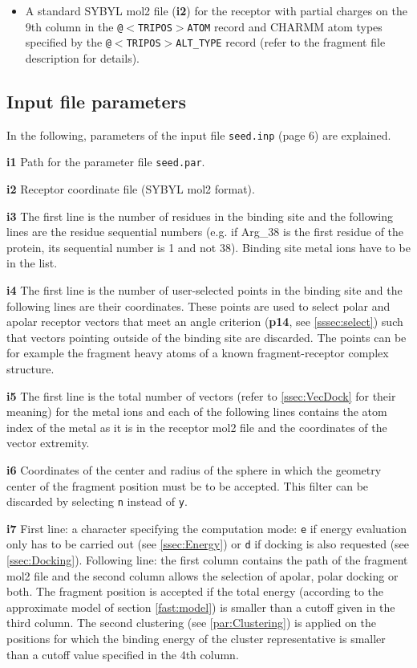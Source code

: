 \documentclass[a4paper,12pt,titlepage]{article}
\begin{document}
\begin{itemize}
\item
A standard SYBYL mol2 file ({\bf i2}) for the receptor with partial charges on the 
9th column in the {\tt @$<$TRIPOS$>$ATOM} record and CHARMM atom types specified by the {\tt @$<$TRIPOS$>$ALT\_TYPE} record (refer to the fragment file description for details).

\end{itemize}

\subsection{Input file parameters}

In the following, parameters of the input file {\tt seed.inp} (page 6) 
are explained.

\noindent
{\bf i1}
Path for the parameter file {\tt seed.par}.

\noindent
{\bf i2}
Receptor coordinate file (SYBYL mol2 format).

\noindent
{\bf i3}
The first line is the number of residues in the binding site and the 
following lines are the residue sequential numbers 
(e.g. if Arg\_38 is the first residue of the protein, its sequential 
number is 1 and not 38). Binding site metal ions 
have to be in the list.

\noindent
{\bf i4}
The first line is the number of user-selected points in the binding site and 
the following lines are their coordinates. These points are used to select 
polar and apolar receptor vectors that meet an angle criterion 
({\bf p14}, see \ref{sssec:select}) such that vectors pointing outside of the binding site 
are discarded. The points can be for example the fragment heavy atoms of 
a known fragment-receptor complex structure. 

\noindent
\textbf{i5}
The first line is the total number of vectors (refer to \ref{ssec:VecDock} for their meaning) for the 
metal ions and each of the following lines contains the atom index of the metal as it is in 
the receptor mol2 file and the coordinates of the vector extremity.

\noindent
{\bf i6}
Coordinates of the center and radius of the sphere in which the geometry center of 
the fragment position must be to be accepted. This filter can be discarded by selecting 
{\tt n} instead of {\tt y}.

\noindent
\textbf{i7}
First line: a character specifying the computation mode: \texttt{e} if energy evaluation only
has to be carried out (see \ref{ssec:Energy}) or \texttt{d} if docking is 
also requested (see \ref{ssec:Docking}).
Following line: the first column contains the path of the fragment mol2 file and the 
second column allows the selection of apolar, polar docking or both. 
The fragment position is accepted if the total energy (according to the approximate model of section \ref{fast:model}) is smaller than a cutoff 
given in the third column. The second clustering (see \ref{par:Clustering}) is applied on the positions 
for which the binding energy of the cluster representative is smaller than a cutoff 
value specified in the 4th column.
\end{document}
